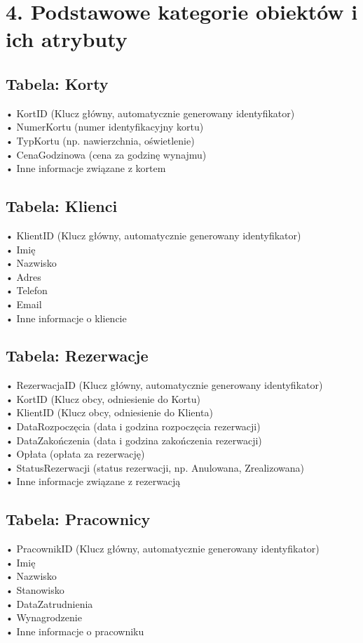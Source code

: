 \documentclass{article}
\begin{document}
\section*{4. Podstawowe kategorie obiektów i ich atrybuty}

\subsection*{Tabela: Korty}
•	KortID (Klucz główny, automatycznie generowany identyfikator)\\
•	NumerKortu (numer identyfikacyjny kortu)\\
•	TypKortu (np. nawierzchnia, oświetlenie)\\
•	CenaGodzinowa (cena za godzinę wynajmu)\\
•	Inne informacje związane z kortem\\

\subsection*{Tabela: Klienci}
•	KlientID (Klucz główny, automatycznie generowany identyfikator)\\
•	Imię\\
•	Nazwisko\\
•	Adres\\
•	Telefon\\
•	Email\\
•	Inne informacje o kliencie

\subsection*{Tabela: Rezerwacje}
•	RezerwacjaID (Klucz główny, automatycznie generowany identyfikator)\\
•	KortID (Klucz obcy, odniesienie do Kortu)\\
•	KlientID (Klucz obcy, odniesienie do Klienta)\\
•	DataRozpoczęcia (data i godzina rozpoczęcia rezerwacji)\\
•	DataZakończenia (data i godzina zakończenia rezerwacji)\\
•	Opłata (opłata za rezerwację)\\
•	StatusRezerwacji (status rezerwacji, np. Anulowana, Zrealizowana)\\
•	Inne informacje związane z rezerwacją\\

\subsection*{Tabela: Pracownicy}
•	PracownikID (Klucz główny, automatycznie generowany identyfikator)\\
•	Imię\\
•	Nazwisko\\
•	Stanowisko\\
•	DataZatrudnienia\\
•	Wynagrodzenie\\
•	Inne informacje o pracowniku
\end{document}
